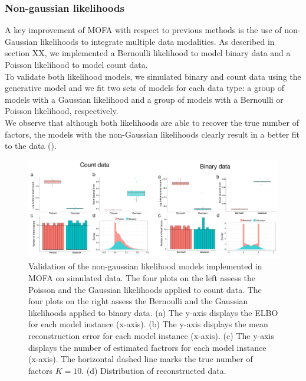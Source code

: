 \subsubsection{Non-gaussian likelihoods}  \label{section:mofa_nongaussian}
A key improvement of MOFA with respect to previous methods is the use of non-Gaussian likelihoods to integrate multiple data modalities. As described in section XX, we implemented a Bernoulli likelihood to model binary data and a Poisson likelihood to model count data.\\
To validate both likelihood models, we simulated binary and count data using the generative model and we fit two sets of models for each data type: a group of models with a Gaussian likelihood and a group of models with a Bernoulli or Poisson likelihood, respectively.\\
We observe that although both likelihoods are able to recover the true number of factors, the models with the non-Gaussian likelihoods clearly result in a better fit to the data ().

\begin{figure}[H]
	\centering 	
	\includegraphics[width=1.0\textwidth]{MOFA_nongaussian}
	\caption{Validation of the non-gaussian likelihood models implemented in MOFA on simulated data. The four plots on the left assess the Poisson and the Gaussian likelihoods applied to count data. The four plots on the right assess the Bernoulli and the Gaussian likelihoods applied to binary data. (a) The y-axis displays the ELBO for each model instance (x-axis). (b) The y-axis displays the mean reconstruction error for each model instance (x-axis). (c) The y-axis displays the number of estimated factrors for each model instance (x-axis). The horizontal dashed line marks the true number of factors $K=10$. (d) Distribution of reconstructed data.}
	\label{fig:MOFA_nongaussian}
\end{figure}


